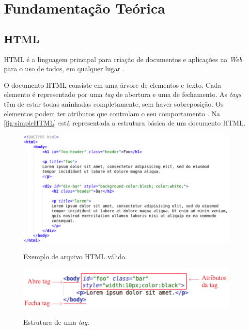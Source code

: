 %
%

\chapter{Fundamentação Teórica}
\label{chap:fund-teor}
\section{HTML}
\label{sec:html}
HTML é a linguagem principal para criação de documentos e aplicações na \textit{Web} para o uso de todos, em qualquer lugar \cite{W3Chtml2015}.

O documento HTML consiste em uma árvore de elementos e texto. Cada elemento é representado por uma \textit{tag} de abertura e uma de fechamento. As \textit{tags} têm de estar todas aninhadas completamente, sem haver sobreposição. Os elementos podem ter atributos que controlam o seu comportamento \cite{HTMLspec2014}. Na \autoref{fig:simpleHTML} está representada a estrutura básica de um documento HTML.

\begin{figure}[!htb]
	\centering
	\caption{Exemplo de arquivo HTML válido.}
	\includegraphics[width=1\textwidth]{./04-figuras/html_simples}
	\label{fig:simpleHTML}
\end{figure}

\begin{figure}[!htb]
	\centering
	\caption{Estrutura de uma \textit{tag}.}
	\includegraphics[width=1\textwidth]{./04-figuras/tag_element_attr_marked}
	\label{fig:tagStruct}
\end{figure}

